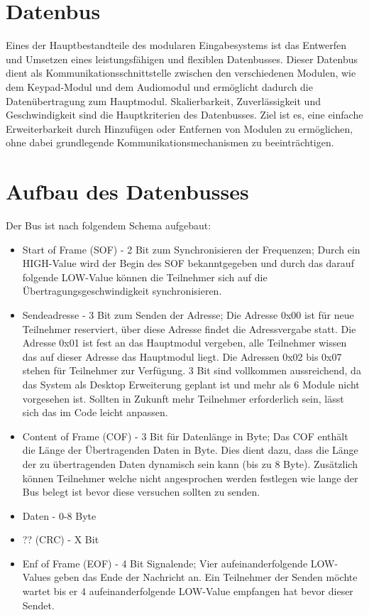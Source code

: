 \section{Datenbus}
Eines der Hauptbestandteile des modularen Eingabesystems ist das Entwerfen und Umsetzen eines leistungsfähigen und flexiblen Datenbusses. Dieser Datenbus dient als Kommunikationsschnittstelle zwischen den verschiedenen Modulen, wie dem Keypad-Modul und dem Audiomodul und ermöglicht dadurch die Datenübertragung zum Hauptmodul. Skalierbarkeit, Zuverlässigkeit und Geschwindigkeit sind die Hauptkriterien des Datenbusses. Ziel ist es, eine einfache Erweiterbarkeit durch Hinzufügen oder Entfernen von Modulen zu ermöglichen, ohne dabei grundlegende Kommunikationsmechanismen zu beeinträchtigen.

\section{Aufbau des Datenbusses}
Der Bus ist nach folgendem Schema aufgebaut:
\begin{itemize}
	\item Start of Frame (SOF) - 2 Bit zum Synchronisieren der Frequenzen; Durch ein HIGH-Value wird der Begin des SOF bekanntgegeben und durch das darauf folgende LOW-Value können die Teilnehmer sich auf die Übertragungsgeschwindigkeit synchronisieren.
	\item Sendeadresse -  3 Bit zum Senden der Adresse; Die Adresse 0x00 ist für neue Teilnehmer reserviert, über diese Adresse findet die Adressvergabe statt. Die Adresse 0x01 ist fest an das Hauptmodul vergeben, alle Teilnehmer wissen das auf dieser Adresse das Hauptmodul liegt. Die Adressen 0x02 bis 0x07 stehen für Teilnehmer zur Verfügung. 3 Bit sind vollkommen aussreichend, da das System als Desktop Erweiterung geplant ist und mehr als 6 Module nicht vorgesehen ist. Sollten in Zukunft mehr Teilnehmer erforderlich sein, lässt sich das im Code leicht anpassen.
	\item Content of Frame (COF) - 3 Bit für Datenlänge in Byte; Das COF enthält die Länge der Übertragenden Daten in Byte. Dies dient dazu, dass die Länge der zu übertragenden Daten dynamisch sein kann (bis zu 8 Byte). Zusätzlich können Teilnehmer welche nicht angesprochen werden festlegen wie lange der Bus belegt ist bevor diese versuchen sollten zu senden.
	\item Daten - 0-8 Byte
	\item ?? (CRC) - X Bit
	\item Enf of Frame (EOF) - 4 Bit Signalende; Vier aufeinanderfolgende LOW-Values geben das Ende der Nachricht an. Ein Teilnehmer der Senden möchte wartet bis er 4 aufeinanderfolgende LOW-Value empfangen hat bevor dieser Sendet.
\end{itemize}

